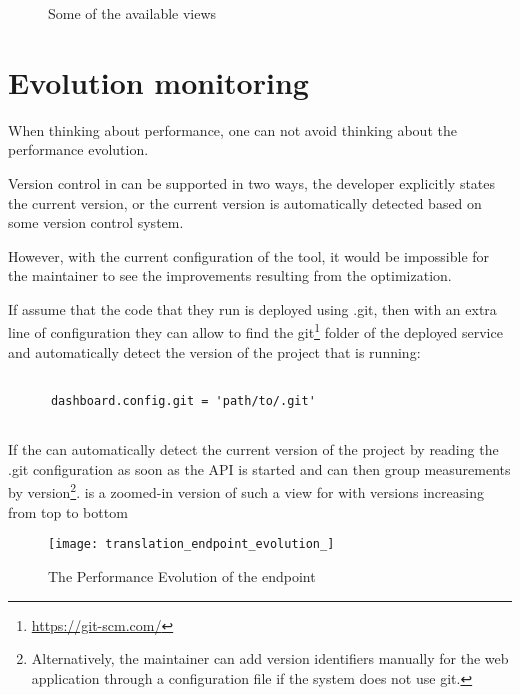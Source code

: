 
\begin{figure*}[h!]
  \centering
  \caption{Some of the available views\label{fig:views}}
\end{figure*}



  \newpage
  \section{Evolution monitoring }
  

  When thinking about performance, 
  one can not avoid thinking about the performance evolution. 

  Version control in \tool can be supported in two ways,
  the developer explicitly states the current version, 
  or the current version is automatically detected based
  on some version control system. 


  However, with the current configuration of the tool, it would be impossible for the maintainer to see the improvements resulting from the optimization. 

  If assume that the code that they run is deployed using .git, then with an extra line of configuration they can allow \tool to find the git\footnote{\url{https://git-scm.com/}} folder of the deployed service and automatically detect the version of the project that is running: 
    
    \begin{lstlisting}[style=custompython]
    
      dashboard.config.git = 'path/to/.git'
      
    \end{lstlisting}  
 
  If the \tool can automatically detect the current version of the project by reading the .git configuration as soon as the API is started and can then group measurements by version\footnote{Alternatively, the maintainer can add version identifiers manually for the web application through a configuration file if the system does not use git.}.  is a zoomed-in version of such a view for \epTranslations with versions increasing from top to bottom
  
  \begin{figure}[h!]
  \centering
  \texttt{[image: translation\_endpoint\_evolution\_]}
  \caption{The Performance Evolution of the \epTranslations endpoint}
  \label{fig:tee}
\end{figure}


